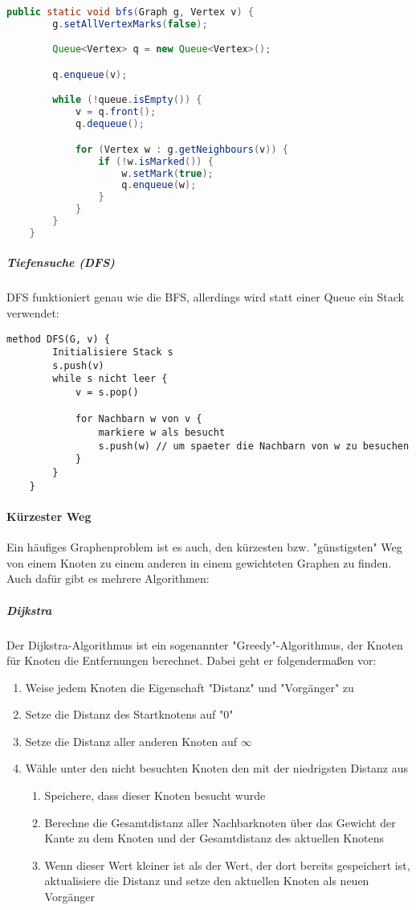 \documentclass{article}
\begin{document}
	\begin{lstlisting}[language=Java, caption=Ein Beispiel für BFS in Java]
	public static void bfs(Graph g, Vertex v) {
		g.setAllVertexMarks(false);

		Queue<Vertex> q = new Queue<Vertex>();

		q.enqueue(v);

		while (!queue.isEmpty()) {
			v = q.front();
			q.dequeue();

			for (Vertex w : g.getNeighbours(v)) {
				if (!w.isMarked()) {
					w.setMark(true);
					q.enqueue(w);
				}
			}
		}
	}
	\end{lstlisting}

	\newpage

	\subparagraph{Tiefensuche (DFS)}
	DFS funktioniert genau wie die BFS, allerdings wird statt einer Queue ein Stack verwendet:

	
	\begin{lstlisting}[caption=Ein Beispiel für DFS in Pseudocode]
	method DFS(G, v) {
		Initialisiere Stack s
		s.push(v)
		while s nicht leer {
			v = s.pop()

			for Nachbarn w von v {
				markiere w als besucht
				s.push(w) // um spaeter die Nachbarn von w zu besuchen
			}
		}
	}
	\end{lstlisting}

	\paragraph{Kürzester Weg}
	Ein häufiges Graphenproblem ist es auch, den kürzesten bzw. "günstigsten" Weg von einem Knoten zu einem anderen in einem gewichteten Graphen zu finden. Auch dafür gibt es mehrere Algorithmen:

	\subparagraph{Dijkstra}
	Der Dijkstra-Algorithmus ist ein sogenannter "Greedy"-Algorithmus, der Knoten für Knoten die Entfernungen berechnet. Dabei geht er folgendermaßen vor:

	\begin{enumerate}
		\item Weise jedem Knoten die Eigenschaft "Distanz" und "Vorgänger" zu
		\item Setze die Distanz des Startknotens auf "0"
		\item Setze die Distanz aller anderen Knoten auf $\infty$
		\item Wähle unter den nicht besuchten Knoten den mit der niedrigsten Distanz aus
			\begin{enumerate}
				\item Speichere, dass dieser Knoten besucht wurde
				\item Berechne die Gesamtdistanz aller Nachbarknoten über das Gewicht der Kante zu dem Knoten und der Gesamtdistanz des aktuellen Knotens
				\item Wenn dieser Wert kleiner ist als der Wert, der dort bereits gespeichert ist, aktualisiere die Distanz und setze den aktuellen Knoten als neuen Vorgänger
			\end{enumerate}
	\end{enumerate}
\end{document}
